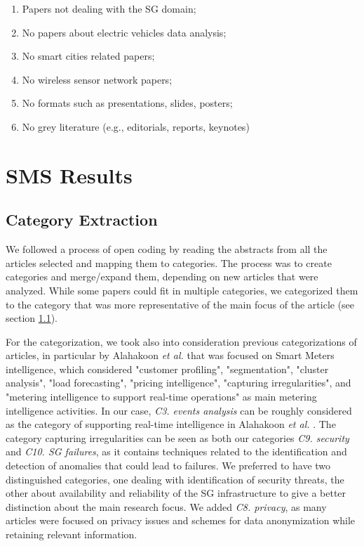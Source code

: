 \documentclass[journal]{IEEEtran}
\begin{document}
\begin{enumerate}
\item[{EC}1.] Papers not dealing with the SG domain;
\item[{EC}2.] No papers about electric vehicles data analysis;
\item[{EC}3.] No smart cities related papers;
\item[{EC}4.] No wireless sensor network papers;
\item[{EC}5.] No formats such as presentations, slides, posters;
\item[{EC}6.] No grey literature (e.g., editorials, reports, keynotes) 
\end{enumerate}

\section{SMS Results}

\subsection{Category Extraction}
\label{sec:category-ext}
We followed a process of open coding by reading the abstracts from all the articles selected and mapping them to categories. The process was to create categories and merge/expand them, depending on new articles that were analyzed. While some papers could fit in multiple categories, we categorized them to the category that was more representative of the main focus of the article (see section \ref{sec:category-ext}).

For the categorization, we took also into consideration previous categorizations of articles, in particular by Alahakoon \textit{et al.} \cite{ref:alahakoon2016futuresurvey} that was focused on Smart Meters intelligence, which considered "customer profiling", "segmentation", "cluster analysis", "load forecasting", "pricing intelligence", "capturing irregularities", and "metering intelligence to support real-time operations" as main metering intelligence activities. In our case, \textit{C3. events analysis} can be roughly considered as the category of supporting real-time intelligence in Alahakoon \textit{et al.} \cite{ref:alahakoon2016futuresurvey}. The category capturing irregularities \cite{ref:alahakoon2016futuresurvey} can be seen as both our categories \textit{C9. security} and \textit{C10. SG failures}, as it contains techniques related to the identification and detection of anomalies that could lead to failures. We preferred to have two distinguished categories, one dealing with identification of security threats, the other about availability and reliability of the SG infrastructure to give a better distinction about the main research focus. We added \textit{C8. privacy}, as many articles were focused on privacy issues and schemes for data anonymization while retaining relevant information.
\end{document}

